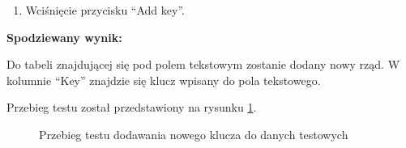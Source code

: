 \begin{enumerate}
\begin{enumerate}
\begin{enumerate}
                    \item Wciśnięcie przycisku ``Add key''.

                \end{enumerate}

                \textbf{Spodziewany wynik:}

                Do tabeli znajdującej się pod polem tekstowym zostanie dodany
                nowy rząd. W kolumnie ``Key'' znajdzie się klucz wpisany do pola
                tekstowego.

                Przebieg testu został przedstawiony na rysunku \ref{newTestDataKeyManualTest}.

                \begin{figure}[h]
                    \centering



                    \caption{Przebieg testu dodawania nowego klucza do danych testowych}
                    \label{newTestDataKeyManualTest}
                \end{figure}

                \FloatBarrier

        \end{enumerate}

\end{enumerate}
